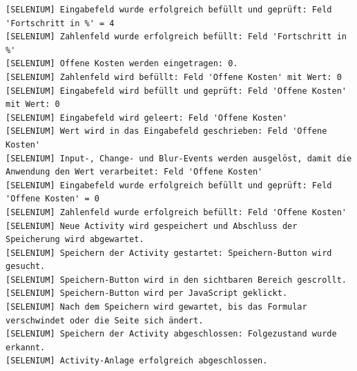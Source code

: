 \begin{lstlisting}[caption={Selenium -- Neue Activity (Erfolgreich)}, label={lst:sel_new_act_ok}, style=logStyle]
[SELENIUM] Eingabefeld wurde erfolgreich befüllt und geprüft: Feld 'Fortschritt in %' = 4
[SELENIUM] Zahlenfeld wurde erfolgreich befüllt: Feld 'Fortschritt in %'
[SELENIUM] Offene Kosten werden eingetragen: 0.
[SELENIUM] Zahlenfeld wird befüllt: Feld 'Offene Kosten' mit Wert: 0
[SELENIUM] Eingabefeld wird befüllt und geprüft: Feld 'Offene Kosten' mit Wert: 0
[SELENIUM] Eingabefeld wird geleert: Feld 'Offene Kosten'
[SELENIUM] Wert wird in das Eingabefeld geschrieben: Feld 'Offene Kosten'
[SELENIUM] Input-, Change- und Blur-Events werden ausgelöst, damit die Anwendung den Wert verarbeitet: Feld 'Offene Kosten'
[SELENIUM] Eingabefeld wurde erfolgreich befüllt und geprüft: Feld 'Offene Kosten' = 0
[SELENIUM] Zahlenfeld wurde erfolgreich befüllt: Feld 'Offene Kosten'
[SELENIUM] Neue Activity wird gespeichert und Abschluss der Speicherung wird abgewartet.
[SELENIUM] Speichern der Activity gestartet: Speichern-Button wird gesucht.
[SELENIUM] Speichern-Button wird in den sichtbaren Bereich gescrollt.
[SELENIUM] Speichern-Button wird per JavaScript geklickt.
[SELENIUM] Nach dem Speichern wird gewartet, bis das Formular verschwindet oder die Seite sich ändert.
[SELENIUM] Speichern der Activity abgeschlossen: Folgezustand wurde erkannt.
[SELENIUM] Activity-Anlage erfolgreich abgeschlossen.
\end{lstlisting}

